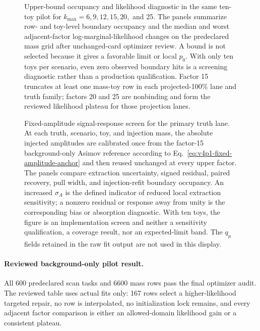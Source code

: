 \begin{figure}[H]
\centering
{}
\caption{Upper-bound occupancy and likelihood diagnostic in the same ten-toy pilot for
$k_{\max}=6,9,12,15,20,$ and 25. The panels summarize row- and toy-level boundary
occupancy and the median and worst adjacent-factor log-marginal-likelihood changes
on the predeclared mass grid after unchanged-card optimizer review. A bound is not
selected because it gives a favorable limit or local $p_0$. With only ten toys per
scenario, even zero observed boundary hits is a screening diagnostic rather than a
production qualification. Factor 15 truncates at least one mass-toy row in each
projected-100\% lane and truth family; factors 20 and 25 are nonbinding and form the
reviewed likelihood plateau for those projection lanes.}
\label{fig:v4p1-ls-bound-sensitivity}
\end{figure}

\begin{figure}[H]
\centering
{}
\caption{Fixed-amplitude signal-response screen for the primary truth lane. At each
truth, scenario, toy, and injection mass, the absolute injected amplitudes are
calibrated once from the factor-15 background-only Asimov reference according to
Eq.~\eqref{eq:v4p1-fixed-amplitude-anchor} and then reused unchanged at every upper
factor. The panels compare extraction uncertainty, signed residual, paired recovery,
pull width, and injection-refit boundary occupancy. An increased $\sigma_A$ is the
defined indicator of reduced local extraction sensitivity; a nonzero residual or
response away from unity is the corresponding bias or absorption diagnostic. With
ten toys, the figure is an implementation screen and neither a sensitivity
qualification, a coverage result, nor an expected-limit band. The $q_\mu$ fields
retained in the raw fit output are not used in this display.}
\label{fig:v4p1-ls-fixed-amplitude-response}
\end{figure}

\paragraph{Reviewed background-only pilot result.}
All 600 predeclared scan tasks and 6600 mass rows pass the final optimizer audit.
The reviewed table uses actual fits only: 167 rows select a higher-likelihood targeted
repair, no row is interpolated, no initialization lock remains, and every adjacent
factor comparison is either an allowed-domain likelihood gain or a consistent
plateau.

